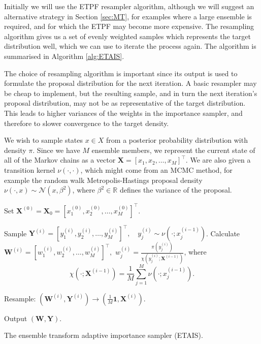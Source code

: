 \documentclass[final]{siamltex}
\newcommand{\X}{{\mathbf X}}
\newcommand{\Y}{{\mathbf Y}}
\newcommand{\W}{{\mathbf W}}
\newcommand{\revised}{}
\begin{document}
Initially we
will use the ETPF resampler algorithm\cite{reich2013nonparametric}, although we
will suggest an alternative strategy in Section \ref{sec:MT}, for
examples where a
large ensemble is required, and for which the ETPF may become more expensive. The
resampling algorithm gives us a set of evenly weighted samples which
represents the target distribution well, which we can use to iterate
the process again. The algorithm is summarised in Algorithm
\ref{alg:ETAIS}.

{\revised The choice of resampling algorithm is important since its
  output is used to formulate the proposal distribution for the next
  iteration. A basic resampler may be cheap to implement, but the
  resulting sample, and in turn the next iteration's proposal distribution, may not be as representative of the target
  distribution. This leads to higher variances of the weights in the
  importance sampler, and therefore to slower convergence to the
  target density.}

We wish to sample states $x \in X$ from a posterior
probability distribution with density {\revised $\pi$}. Since we have $M$ ensemble members, we
represent the current state of all of the Markov chains as a vector
$\X = [x_1,x_2,\ldots,x_M]^\top$. We are also given a transition kernel
$\nu(\cdot,\cdot)$, which might come from an MCMC method, for example
the random walk Metropolis-Hastings proposal density $\nu(\cdot,x) \sim
\mathcal{N}(x,\beta^2)$, where $\beta^2\in \mathbb{R}$ defines the
variance of the proposal.

\begin{table}[!ht]
\centering
\begin{algorithm}[H]
\DontPrintSemicolon
\BlankLine
	Set $\X^{(0)} = \X_0 = [x_1^{(0)},x_2^{(0)},\ldots,x_M^{(0)}]^\top$.\;
	{
		Sample $\Y^{(i)} = [y_1^{(i)},y_2^{(i)},\ldots,y_M^{(i)}]^\top, \quad y_j^{(i)} \sim
\nu(\cdot;x_j^{(i-1)})$.\label{algline:ETAIS_propose}\;
		Calculate $\W^{(i)} = [w_1^{(i)},w_2^{(i)},\ldots,w_M^{(i)}]^\top,$ \quad $w^{(i)}_j =
\frac{\pi(y_j^{(i)})}{\chi(y_j^{(i)};\X^{(i-1)})}$, where
		\[
			\chi(\cdot;\X^{(i-1)}) = \frac{1}{M}\sum_{j=1}^M \nu(\cdot;x_j^{(i-1)}).
		\]

		Resample: $(\W^{(i)},\Y^{(i)}) \rightarrow (\frac{1}{M}\mathbf{1}, \X^{(i)})$.\label{algline:ETAIS_resample}\;
	}
	Output $(\W, \Y)$.\;
\caption{The ensemble transform adaptive importance sampler (ETAIS).\label{alg:ETAIS}}
\end{algorithm}
\end{table}
\end{document}
